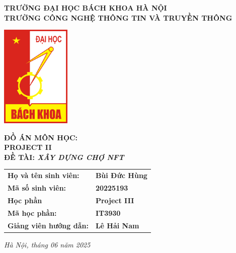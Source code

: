 \begin{titlepage}
    \begin{center}
    \textbf{TRƯỜNG ĐẠI HỌC BÁCH KHOA HÀ NỘI}\\
    \textbf{TRƯỜNG CÔNG NGHỆ THÔNG TIN VÀ TRUYỀN THÔNG}\\
    \vspace{0.5cm}
    
    \includegraphics[width=0.25\textwidth]{coverpage/images/logo-hust.png}\\ 
    \vspace{0.5cm}
    
    \textbf{\LARGE ĐỒ ÁN MÔN HỌC:}\\[0.3cm]
    \textbf{\LARGE PROJECT II}\\[0.3cm]
    \textbf{\Large ĐỀ TÀI: \textit{XÂY DỰNG CHỢ NFT}}\\
    \vspace{1cm}
    
    \begin{tabular}{ll}
    \textbf{Họ và tên sinh viên:} & \textbf{ Bùi Đức Hùng} \\[0.3cm]
    \textbf{Mã số sinh viên:} & \textbf{ 20225193} \\[0.3cm]
    \textbf{Học phần} & \textbf{ Project III} \\[0.3cm]
    \textbf{Mã học phần:} & \textbf{ IT3930} \\[0.3cm]
    \textbf{Giảng viên hướng dẫn:} & \textbf{ Lê Hải Nam} \\
    \end{tabular}
    
    \vfill
    \textit{Hà Nội, tháng 06 năm 2025}
    \end{center}
    \end{titlepage}
    